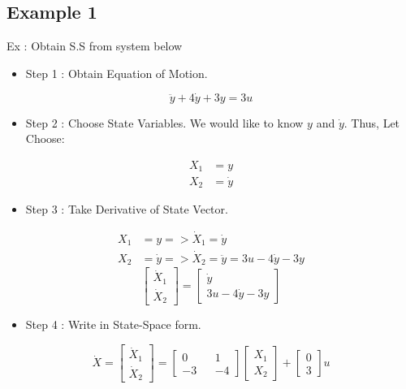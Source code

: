 \documentclass[12pt,a4paper]{article}
\begin{document}
	\subsection{Example 1}
	Ex : Obtain S.S from system below
	\begin{itemize}
		\item Step 1 : Obtain Equation of Motion.
	\end{itemize}
	\[
	\ddot{y} + 4 \dot{y} + 3 y = 3 u
	\]
	\begin{itemize}
		\item Step 2 : Choose State Variables. We would like to know \(y\) and \(\dot{y}\). Thus, Let Choose:
	\end{itemize}
	\[
	\begin{split}
		X_1 &= y \\
		X_2 &= \dot{y}
	\end{split}
	\]
	\begin{itemize}
		\item Step 3 : Take Derivative of State Vector.
	\end{itemize}
	\[
	\begin{split}
		X_1 &= y => \dot{X}_1 = \dot{y}\\
		X_2 &= \dot{y} => \dot{X}_2 = \ddot{y} = 3u - 4 \dot{y} - 3 y
	\end{split}
	\]
	\[
	\begin{bmatrix}
		\dot{X}_1 \\
		\dot{X}_2 
	\end{bmatrix} =
	\begin{bmatrix}
		\dot{y}              \\
		3u - 4 \dot{y} - 3 y 
	\end{bmatrix}
	\]
	\begin{itemize}
		\item Step 4 : Write in State-Space form.
	\end{itemize}
	\[
	\dot{X} = 
	\begin{bmatrix}
		\dot{X}_1 \\
		\dot{X}_2 
	\end{bmatrix} =
	\begin{bmatrix}
		0  &   & 1  \\
		-3 &   & -4 
	\end{bmatrix}
	\begin{bmatrix}
		X_1 \\
		X_2 
	\end{bmatrix} +
	\begin{bmatrix}
		0 \\
		3 
	\end{bmatrix} u
	\]
\end{document}
